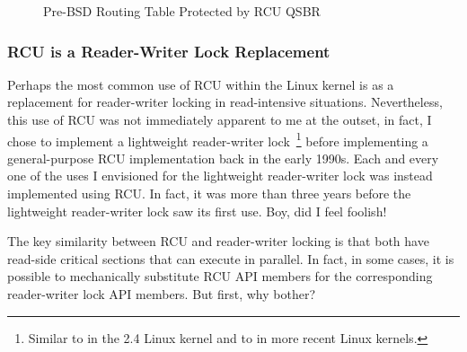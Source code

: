 \begin{figure}[tb]
\centering
{}
\caption{Pre-BSD Routing Table Protected by RCU QSBR}
\label{fig:defer:Pre-BSD Routing Table Protected by RCU QSBR}
\end{figure}

\subsubsection{RCU is a Reader-Writer Lock Replacement}
\label{sec:defer:RCU is a Reader-Writer Lock Replacement}

Perhaps the most common use of RCU within the Linux kernel is as
a replacement for reader-writer locking in read-intensive situations.
Nevertheless, this use of RCU was not immediately apparent to me
at the outset, in fact, I chose to implement a lightweight reader-writer
lock~\cite{WilsonCHsieh92a}\footnote{
	Similar to  in the 2.4 Linux kernel and to
	 in more recent Linux kernels.}
before implementing a general-purpose RCU implementation
back in the early 1990s.
Each and every one of the uses I envisioned for the lightweight reader-writer
lock was instead implemented using RCU\@.
In fact, it was more than
three years before the lightweight reader-writer lock saw its first use.
Boy, did I feel foolish!

The key similarity between RCU and reader-writer locking is that
both have read-side critical sections that can execute in parallel.
In fact, in some cases, it is possible to mechanically substitute RCU API
members for the corresponding reader-writer lock API members.
But first, why bother?

